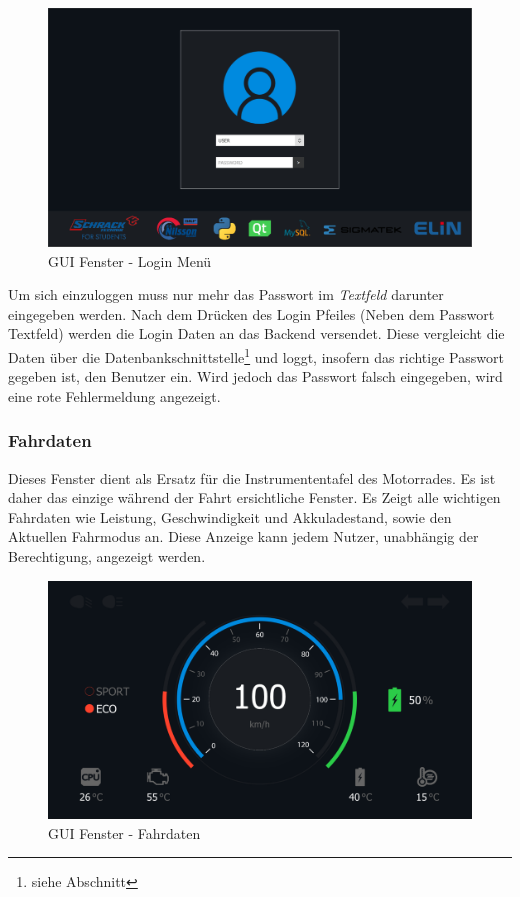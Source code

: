 \begin{figure}[H]
	\begin{center}
		\includegraphics[scale=0.25]{figures/hcis/window_login.png}
			\caption{GUI Fenster - Login Menü}
			\label{fig:pageMenu}
	\end{center}
\end{figure}

 Um sich einzuloggen muss nur mehr das Passwort im \textit{Textfeld} darunter eingegeben werden. Nach dem Drücken des Login Pfeiles (Neben dem Passwort Textfeld) werden die Login Daten an das Backend versendet. Diese vergleicht die Daten über die Datenbankschnittstelle\footnote{siehe Abschnitt} und loggt, insofern das richtige Passwort gegeben ist, den Benutzer ein. Wird jedoch das Passwort falsch eingegeben, wird eine rote Fehlermeldung angezeigt.\\
 
\subsubsection{Fahrdaten}		

Dieses Fenster dient als Ersatz für die Instrumententafel des Motorrades. Es ist daher das einzige während der Fahrt ersichtliche Fenster. Es Zeigt alle wichtigen Fahrdaten wie Leistung, Geschwindigkeit und Akkuladestand, sowie den Aktuellen Fahrmodus an. Diese Anzeige kann jedem Nutzer, unabhängig der Berechtigung, angezeigt werden.

\begin{figure}[H]
	\begin{center}
		\includegraphics[scale=0.25]{figures/hcis/window_dashboard.png}
			\caption{GUI Fenster - Fahrdaten}
			\label{fig:pageDash}
	\end{center}
\end{figure}

